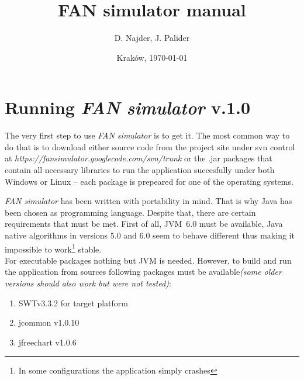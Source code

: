\documentclass[a4paper,12pt]{article}
\title{FAN simulator manual}
\author{D. Najder, J. Palider}
\date{Krak\'ow, \today}
\begin{document}
	\maketitle
	
	\newpage
		
	\section{Running \emph{FAN simulator} v.1.0}
	
	The very first step to use \emph{FAN simulator} is to get it. The most common
	way to do that is to download either source code from the project site under
	svn control at \emph{https://fansimulator.googlecode.com/svn/trunk} or the
	.jar packages that contain all necessary libraries to run the application
	succesfully under both Windows or Linux -- each package is prepeared for one of
	the operating systems.	
	
	\emph{FAN simulator} has been written with portability in mind. That is why
	Java has been chosen as programming language. Despite that, there are certain
	requirements that must be met. First of all, JVM~6.0 must be available, Java
	native algorithms in versions 5.0 and 6.0 seem to behave different thus making
	it impossible to work\footnote{In some configurations the application
	simply crashes} stable.\\
	For executable packages nothing but JVM is needed. However, to build and run
	the application from sources following packages must be available\emph{(some
	older versions should also work but were not tested)}:
	\begin{enumerate}
	\item {SWTv3.3.2 for target platform}
	\item {jcommon v1.0.10}
	\item {jfreechart v1.0.6}
	\end{enumerate}
	
	
\end{document}

